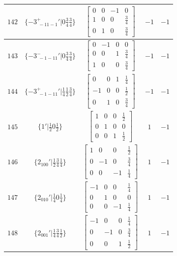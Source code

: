 \documentclass[fleqn,8pt]{jsarticle}
\begin{document}
\begin{longtable}{ccccc}
$ 142 $ & $ \{-3^{+}_{\,\,-11-1}{}'|0 \frac{3}{4} \frac{3}{4}\} $ & $ \begin{bmatrix} 0 & 0 & -1 & 0 \\ 1 & 0 & 0 & \frac{3}{4} \\ 0 & 1 & 0 & \frac{3}{4} \end{bmatrix} $ & $ -1 $ & $ -1 $ \\ \hline
$ 143 $ & $ \{-3^{-}_{\,\,-1-11}{}'|0 \frac{3}{4} \frac{3}{4}\} $ & $ \begin{bmatrix} 0 & -1 & 0 & 0 \\ 0 & 0 & 1 & \frac{3}{4} \\ 1 & 0 & 0 & \frac{3}{4} \end{bmatrix} $ & $ -1 $ & $ -1 $ \\ \hline
$ 144 $ & $ \{-3^{+}_{\,\,-1-11}{}'|\frac{1}{4} \frac{1}{2} \frac{3}{4}\} $ & $ \begin{bmatrix} 0 & 0 & 1 & \frac{1}{4} \\ -1 & 0 & 0 & \frac{1}{2} \\ 0 & 1 & 0 & \frac{3}{4} \end{bmatrix} $ & $ -1 $ & $ -1 $ \\ \hline
$ 145 $ & $ \{1{}'|\frac{1}{2} 0 \frac{1}{2}\} $ & $ \begin{bmatrix} 1 & 0 & 0 & \frac{1}{2} \\ 0 & 1 & 0 & 0 \\ 0 & 0 & 1 & \frac{1}{2} \end{bmatrix} $ & $ 1 $ & $ -1 $ \\ \hline
$ 146 $ & $ \{2{}_{100}{}'|\frac{1}{2} \frac{3}{4} \frac{1}{4}\} $ & $ \begin{bmatrix} 1 & 0 & 0 & \frac{1}{2} \\ 0 & -1 & 0 & \frac{3}{4} \\ 0 & 0 & -1 & \frac{1}{4} \end{bmatrix} $ & $ 1 $ & $ -1 $ \\ \hline
$ 147 $ & $ \{2{}_{010}{}'|\frac{1}{4} 0 \frac{1}{4}\} $ & $ \begin{bmatrix} -1 & 0 & 0 & \frac{1}{4} \\ 0 & 1 & 0 & 0 \\ 0 & 0 & -1 & \frac{1}{4} \end{bmatrix} $ & $ 1 $ & $ -1 $ \\ \hline
$ 148 $ & $ \{2{}_{001}{}'|\frac{1}{4} \frac{3}{4} \frac{1}{2}\} $ & $ \begin{bmatrix} -1 & 0 & 0 & \frac{1}{4} \\ 0 & -1 & 0 & \frac{3}{4} \\ 0 & 0 & 1 & \frac{1}{2} \end{bmatrix} $ & $ 1 $ & $ -1 $ \\ \hline

\end{longtable}
\end{document}
